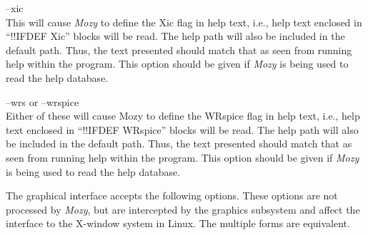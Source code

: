 \begin{description}
\item{\vt --xic}\\
This will cause {\it Mozy} to define the {\vt Xic} flag in help text,
i.e., help text enclosed in ``{\vt !!IFDEF Xic}'' blocks will be read. 
The {\Xic} help path will also be included in the default path.  Thus,
the text presented should match that as seen from running help within
the {\Xic} program.  This option should be given if {\it Mozy} is
being used to read the {\Xic} help database.

\item{\vt --wrs} or {\vt --wrspice}\\
Either of these will cause {\vt Mozy} to define the {\vt WRspice} flag
in help text, i.e., help text enclosed in ``{\vt !!IFDEF WRspice}''
blocks will be read.  The {\WRspice} help path will also be included
in the default path.  Thus, the text presented should match that as
seen from running help within the {\WRspice} program.  This option
should be given if {\it Mozy} is being used to read the {\WRspice}
help database.
\end{description}

The graphical interface accepts the following options.  These options
are not processed by {\it Mozy}, but are intercepted by the graphics
subsystem and affect the interface to the X-window system in Linux. 
The multiple forms are equivalent.

